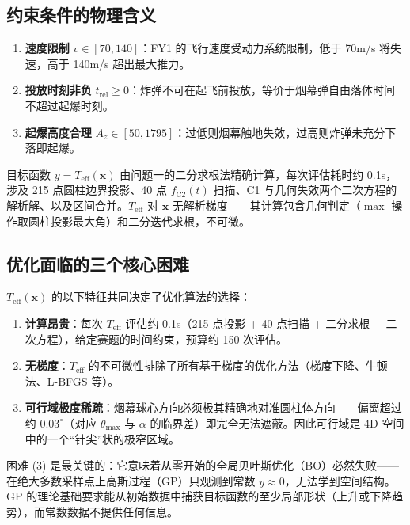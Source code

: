 \documentclass[12pt,a4paper]{ctexart}
\newcommand{\Teff}{T_{\text{eff}}}
\begin{document}
\subsection{约束条件的物理含义}

\begin{enumerate}[label=(C\arabic*), leftmargin=*]
    \item \textbf{速度限制} $v \in [70, 140]$：FY1 的飞行速度受动力系统限制，低于 70m/s 将失速，高于 140m/s 超出最大推力。
    \item \textbf{投放时刻非负} $t_{\text{rel}} \geq 0$：炸弹不可在起飞前投放，等价于烟幕弹自由落体时间不超过起爆时刻。
    \item \textbf{起爆高度合理} $A_z \in [50, 1795]$：过低则烟幕触地失效，过高则炸弹未充分下落即起爆。
\end{enumerate}

目标函数 $y = \Teff(\mathbf{x})$ 由问题一的二分求根法精确计算，每次评估耗时约 0.1s，涉及 215 点圆柱边界投影、40 点 $f_{\text{C2}}(t)$ 扫描、C1 与几何失效两个二次方程的解析解、以及区间合并。$\Teff$ 对 $\mathbf{x}$ 无解析梯度——其计算包含几何判定（$\max$ 操作取圆柱投影最大角）和二分迭代求根，不可微。

\subsection{优化面临的三个核心困难}

$\Teff(\mathbf{x})$ 的以下特征共同决定了优化算法的选择：

\begin{enumerate}[label=(\arabic*), leftmargin=*]
    \item \textbf{计算昂贵}：每次 $\Teff$ 评估约 0.1s（215 点投影 + 40 点扫描 + 二分求根 + 二次方程），给定赛题的时间约束，预算约 150 次评估。
    \item \textbf{无梯度}：$\Teff$ 的不可微性排除了所有基于梯度的优化方法（梯度下降、牛顿法、L-BFGS 等）。
    \item \textbf{可行域极度稀疏}：烟幕球心方向必须极其精确地对准圆柱体方向——偏离超过约 $0.03^\circ$（对应 $\theta_{\max}$ 与 $\alpha$ 的临界差）即完全无法遮蔽。因此可行域是 4D 空间中的一个``针尖''状的极窄区域。
\end{enumerate}

困难 (3) 是最关键的：它意味着从零开始的全局贝叶斯优化（BO）必然失败——在绝大多数采样点上高斯过程（GP）只观测到常数 $y \approx 0$，无法学到空间结构。GP 的理论基础要求能从初始数据中捕获目标函数的至少局部形状（上升或下降趋势），而常数数据不提供任何信息。
\end{document}
